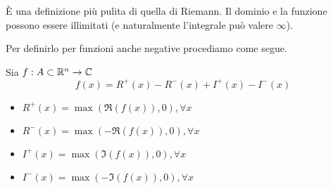 \begin{rem}
È una definizione più pulita di quella di Riemann. Il dominio e la funzione possono essere illimitati (e naturalmente l'integrale può valere $\infty $).
\end{rem}
Per definirlo per funzioni anche negative procediamo come segue.

Sia $f: A\subset \mathbb{R}^{n}\rightarrow \mathbb{C}$
\begin{equation*}
f(x) = R^{+}(x) - R^{-}(x) + I^{+}(x) - I^{-}(x)
\end{equation*}
\begin{itemize}
\item $R^{+}(x) = \max(\Re (f(x)), 0), \forall x$
\item $R^{-}(x) = \max(- \Re (f(x)), 0), \forall x$
\item $I^{+}(x) = \max(\Im (f(x)), 0), \forall x$
\item $I^{-}(x) = \max(- \Im (f(x)), 0), \forall x$
\end{itemize}


